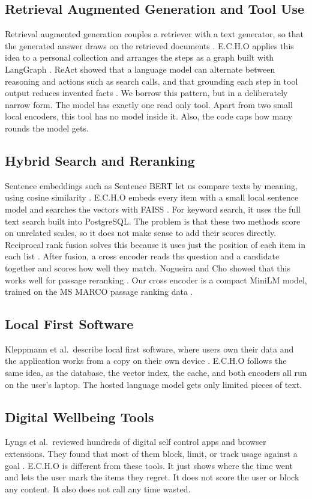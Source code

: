 \documentclass[conference]{IEEEtran}
\begin{document}
\subsection{Retrieval Augmented Generation and Tool Use}
Retrieval augmented generation couples a retriever with a text generator, so that the generated answer draws on the retrieved documents \cite{b4}. E.C.H.O applies this idea to a personal collection and arranges the steps as a graph built with LangGraph \cite{b5}. ReAct showed that a language model can alternate between reasoning and actions such as search calls, and that grounding each step in tool output reduces invented facts \cite{b13}. We borrow this pattern, but in a deliberately narrow form. The model has exactly one read only tool. Apart from two small local encoders, this tool has no model inside it. Also, the code caps how many rounds the model gets.

\subsection{Hybrid Search and Reranking}
Sentence embeddings such as Sentence BERT let us compare texts by meaning, using cosine similarity \cite{b6}. E.C.H.O embeds every item with a small local sentence model \cite{b16} and searches the vectors with FAISS \cite{b8}. For keyword search, it uses the full text search built into PostgreSQL. The problem is that these two methods score on unrelated scales, so it does not make sense to add their scores directly. Reciprocal rank fusion solves this because it uses just the position of each item in each list \cite{b9}. After fusion, a cross encoder reads the question and a candidate together and scores how well they match. Nogueira and Cho showed that this works well for passage reranking \cite{b10}. Our cross encoder is a compact MiniLM \cite{b7} model, trained on the MS MARCO passage ranking data \cite{b11}.

\subsection{Local First Software}
Kleppmann et al.\ describe local first software, where users own their data and the application works from a copy on their own device \cite{b12}. E.C.H.O follows the same idea, as the database, the vector index, the cache, and both encoders all run on the user's laptop. The hosted language model gets only limited pieces of text.

\subsection{Digital Wellbeing Tools}
Lyngs et al.\ reviewed hundreds of digital self control apps and browser extensions. They found that most of them block, limit, or track usage against a goal \cite{b14}. E.C.H.O is different from these tools. It just shows where the time went and lets the user mark the items they regret. It does not score the user or block any content. It also does not call any time wasted.
\end{document}
